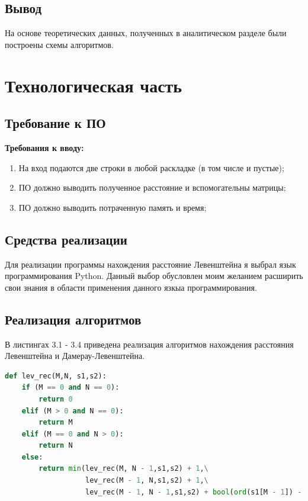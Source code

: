 \documentclass[12pt]{report}
\begin{document}
\section {Вывод} На основе теоретических данных, полученных в аналитическом разделе были построены схемы алгоритмов.

\chapter{Технологическая часть}

\section{Требование к ПО}
\textbf{Требования к вводу:}
\begin{enumerate}
	\item На вход подаются две строки в любой раскладке (в том числе и пустые);
	\item ПО должно выводить полученное расстояние и вспомогательны матрицы;
	\item ПО должно выводить потраченную память и время;
\end{enumerate}

\section{Средства реализации}
Для реализации программы нахождения расстояние Левенштейна я выбрал язык программирования Python. Данный
выбор обусловлен моим желанием расширить свои знания в области
применения данного язкыа программирования.

\section{Реализация алгоритмов}

В листингах 3.1 - 3.4 приведена реализация алгоритмов нахождения расстояния Левенштейна и Дамерау-Левенштейна.

\begin{lstlisting}[label=some-code,caption=Функция нахождения расстояния Левенштейна рекурсивно,language=Python]
def lev_rec(M,N, s1,s2):
    if (M == 0 and N == 0):
        return 0
    elif (M > 0 and N == 0):
        return M
    elif (M == 0 and N > 0):
        return N
    else:
        return min(lev_rec(M, N - 1,s1,s2) + 1,\
                   lev_rec(M - 1, N,s1,s2) + 1,\
                   lev_rec(M - 1, N - 1,s1,s2) + bool(ord(s1[M - 1]) - ord(s2[N - 1])))
\end{lstlisting}
\clearpage
\end{document}
